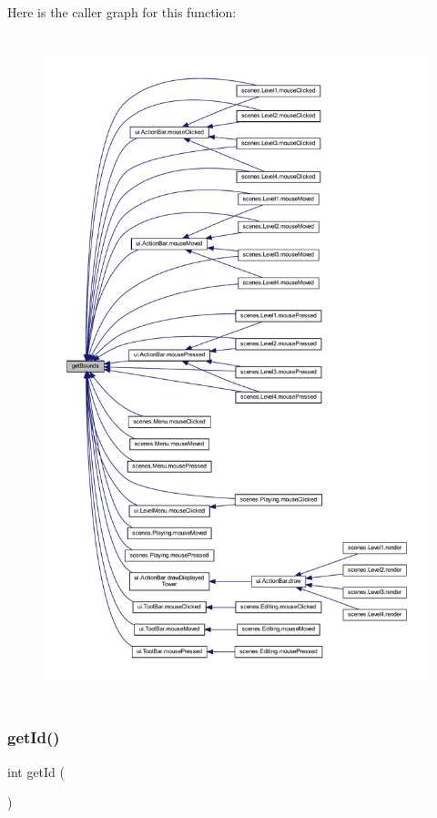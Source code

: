 Here is the caller graph for this function\+:\nopagebreak
\begin{figure}[H]
\begin{center}
\leavevmode
\includegraphics[height=550pt]{classui_1_1_my_button_a187945475e730bfa340a10f63224e91f_icgraph}
\end{center}
\end{figure}
\mbox{\label{classui_1_1_my_button_a67283be3f45257d1e0c474c563ebb6b6}} 
\subsubsection{\texorpdfstring{get\+Id()}{getId()}}
{\footnotesize\ttfamily int get\+Id (\begin{DoxyParamCaption}{ }\end{DoxyParamCaption})}



